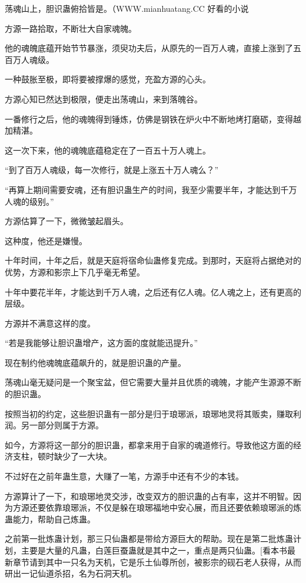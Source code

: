 
\begin{this_body}

荡魂山上，胆识蛊俯拾皆是。（WWW.mianhuatang.CC 好看的小说

方源一路拾取，不断壮大自家魂魄。

他的魂魄底蕴开始节节暴涨，须臾功夫后，从原先的一百万人魂，直接上涨到了五百万人魂级。

一种鼓胀至极，即将要被撑爆的感觉，充盈方源的心头。

方源心知已然达到极限，便走出荡魂山，来到落魄谷。

一番修行之后，他的魂魄得到锤炼，仿佛是钢铁在炉火中不断地烤打磨砺，变得越加精湛。

这一次下来，他的魂魄底蕴稳定在了一百五十万人魂上。

“到了百万人魂级，每一次修行，就是上涨五十万人魂么？”

“再算上期间需要安魂，还有胆识蛊生产的时间，我至少需要半年，才能达到千万人魂的级别。”

方源估算了一下，微微皱起眉头。

这种度，他还是嫌慢。

十年时间，十年之后，就是天庭将宿命仙蛊修复完成。到那时，天庭将占据绝对的优势，方源和影宗上下几乎毫无希望。

十年中要花半年，才能达到千万人魂，之后还有亿人魂。亿人魂之上，还有更高的层级。

方源并不满意这样的度。

“若是我能够让胆识蛊增产，这方面的度就能迅提升。”

现在制约他魂魄底蕴飙升的，就是胆识蛊的产量。

荡魂山毫无疑问是一个聚宝盆，但它需要大量并且优质的魂魄，才能产生源源不断的胆识蛊。

按照当初的约定，这些胆识蛊有一部分是归于琅琊派，琅琊地灵将其贩卖，赚取利润。另一部分则属于方源。

如今，方源将这一部分的胆识蛊，都拿来用于自家的魂道修行。导致他这方面的经济支柱，顿时缺少了一大块。

不过好在之前年蛊生意，大赚了一笔，方源手中还有不少的本钱。

方源算计了一下，和琅琊地灵交涉，改变双方的胆识蛊的占有率，这并不明智。因为方源还要依靠琅琊派，不仅是躲在琅琊福地中安心展，而且还要依赖琅琊派的炼蛊能力，帮助自己炼蛊。

之前第一批炼蛊计划，那三只仙蛊都是带给方源巨大的帮助。现在是第二批炼蛊计划，主要是大量的凡蛊，白莲巨蚕蛊就是其中之一，重点是两只仙蛊。[看本书最新章节请到其中一只名为天机，它是乐土仙尊所创，被影宗的砚石老人获得，从而研出一记仙道杀招，名为石洞天机。


\end{this_body}
